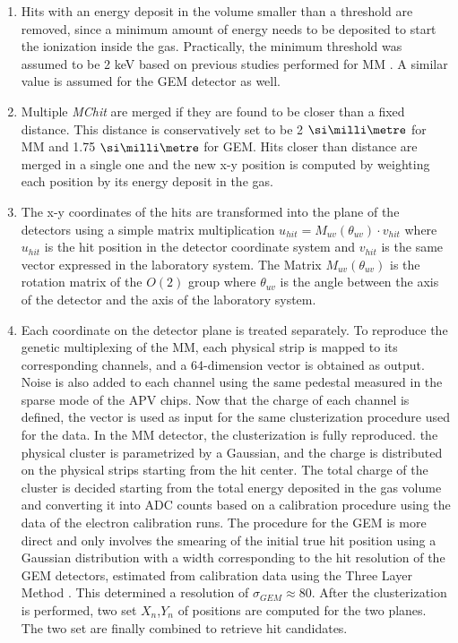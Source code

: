 \begin{enumerate}

\item Hits with an energy deposit in the volume smaller than a threshold are removed, since a minimum amount of energy needs to be deposited to start the ionization inside the gas. Practically, the minimum threshold was assumed to be 2 keV based on previous studies performed for MM \cite{IGUAZ20121079}. A similar value is assumed for the GEM detector as well.
\item Multiple \textit{MChit} are merged if they are found to be closer than a fixed distance. This distance is conservatively set to be 2 $\mmi$  for MM and 1.75 $\mmi$  for GEM. Hits closer than distance are merged in a single one and the new x-y position is computed by weighting each position by its energy deposit in the gas.
\item The x-y coordinates of the hits are transformed into the plane of the detectors using a simple matrix multiplication $u_{hit} = M_{uv}(\theta_{uv}) \cdot v_{hit}$ where $u_{hit}$ is the hit position in the detector coordinate system and $v_{hit}$ is the same vector expressed in the laboratory system. The Matrix $M_{uv}(\theta_{uv})$ is the rotation matrix of the $O(2)$ group where $\theta_{uv}$ is the angle between the axis of the detector and the axis of the laboratory system.
\item Each coordinate on the detector plane is treated separately. To reproduce the genetic multiplexing of the MM, each physical strip is mapped to its corresponding channels, and a 64-dimension vector is obtained as output. Noise is also added to each channel using the same pedestal measured in the sparse mode of the APV chips. Now that the charge of each channel is defined, the vector is used as input for the same clusterization procedure used for the data. In the MM detector, the clusterization is fully reproduced. the physical cluster is parametrized by a Gaussian, and the charge is distributed on the physical strips starting from the hit center. The total charge of the cluster is decided starting from the total energy deposited in the gas volume and converting it into ADC counts based on a calibration procedure using the data of the electron calibration runs. The procedure for the GEM is more direct and only involves the smearing of the initial true hit position using a Gaussian distribution with a width corresponding to the hit resolution of the GEM detectors, estimated from calibration data using the Three Layer Method \cite{Bortfeldt:2014vvt}. This determined a resolution of $\sigma_{GEM} \approx 80$\mum. After the clusterization is performed, two set $X_n$,$Y_n$ of positions are computed for the two planes. The two set are finally combined to retrieve hit candidates.

\end{enumerate}
